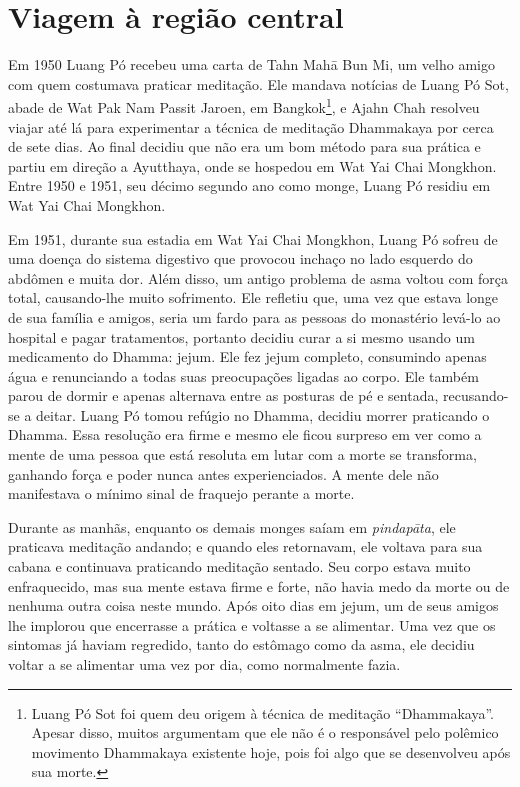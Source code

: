 \chapter{Viagem à região central}

Em 1950 Luang Pó recebeu uma carta de Tahn Mahā Bun Mi, um velho amigo
com quem costumava praticar meditação. Ele mandava notícias de Luang Pó
Sot, abade de Wat Pak Nam Passit Jaroen, em Bangkok\footnote{Luang Pó
  Sot foi quem deu origem à técnica de meditação ``Dhammakaya''. Apesar
  disso, muitos argumentam que ele não é o responsável pelo polêmico
  movimento Dhammakaya existente hoje, pois foi algo que se desenvolveu
  após sua morte.}, e Ajahn Chah resolveu viajar até lá para
experimentar a técnica de meditação Dhammakaya por cerca de sete dias.
Ao final decidiu que não era um bom método para sua prática e partiu em
direção a Ayutthaya, onde se hospedou em Wat Yai Chai Mongkhon. Entre
1950 e 1951, seu décimo segundo ano como monge, Luang Pó residiu em Wat
Yai Chai Mongkhon.

Em 1951, durante sua estadia em Wat Yai Chai Mongkhon, Luang Pó sofreu
de uma doença do sistema digestivo que provocou inchaço no lado esquerdo
do abdômen e muita dor. Além disso, um antigo problema de asma voltou
com força total, causando-lhe muito sofrimento. Ele refletiu que, uma
vez que estava longe de sua família e amigos, seria um fardo para as
pessoas do monastério levá-lo ao hospital e pagar tratamentos, portanto
decidiu curar a si mesmo usando um medicamento do Dhamma: jejum. Ele fez
jejum completo, consumindo apenas água e renunciando a todas suas
preocupações ligadas ao corpo. Ele também parou de dormir e apenas
alternava entre as posturas de pé e sentada, recusando-se a deitar.
Luang Pó tomou refúgio no Dhamma, decidiu morrer praticando o Dhamma.
Essa resolução era firme e mesmo ele ficou surpreso em ver como a mente
de uma pessoa que está resoluta em lutar com a morte se transforma,
ganhando força e poder nunca antes experienciados. A mente dele não
manifestava o mínimo sinal de fraquejo perante a morte.

Durante as manhãs, enquanto os demais monges saíam em \emph{pindapāta},
ele praticava meditação andando; e quando eles retornavam, ele voltava
para sua cabana e continuava praticando meditação sentado. Seu corpo
estava muito enfraquecido, mas sua mente estava firme e forte, não havia
medo da morte ou de nenhuma outra coisa neste mundo. Após oito dias em
jejum, um de seus amigos lhe implorou que encerrasse a prática e
voltasse a se alimentar. Uma vez que os sintomas já haviam regredido,
tanto do estômago como da asma, ele decidiu voltar a se alimentar uma
vez por dia, como normalmente fazia.

